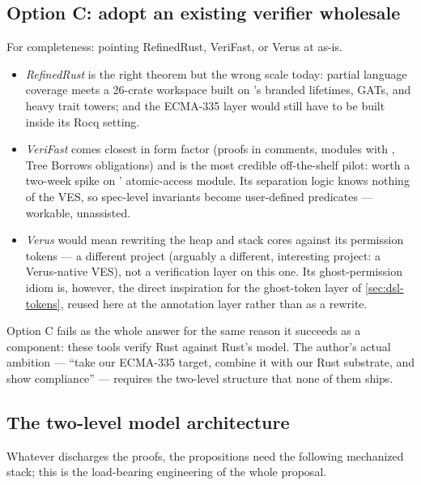 \subsection{Option C: adopt an existing verifier wholesale}
\label{sec:design-adopt}

For completeness: pointing RefinedRust, VeriFast, or Verus at
 as-is.

\begin{itemize}[leftmargin=1.4em]
\item \emph{RefinedRust} is the right theorem but the wrong scale today:
  partial language coverage meets a 26-crate workspace built on
  \gcarena{}'s branded lifetimes, GATs, and heavy trait towers; and the
  ECMA-335 layer would still have to be built inside its Rocq setting.
\item \emph{VeriFast} comes closest in form factor (proofs in comments,
  modules with , Tree Borrows obligations) and is the most
  credible off-the-shelf pilot: worth a two-week spike on
  ' atomic-access module. Its separation logic knows
  nothing of the VES, so spec-level invariants become user-defined
  predicates --- workable, unassisted.
\item \emph{Verus} would mean rewriting the heap and stack cores against
  its permission tokens --- a different project (arguably a different,
  interesting project: a Verus-native VES), not a verification layer on
  this one. Its ghost-permission idiom is, however, the direct
  inspiration for the ghost-token layer of \cref{sec:dsl-tokens},
  reused here at the annotation layer rather than as a rewrite.
\end{itemize}

Option C fails as the whole answer for the same reason it succeeds as a
component: these tools verify Rust against Rust's model. The author's
actual ambition --- ``take our ECMA-335 target, combine it with our Rust
substrate, and show compliance'' --- requires the two-level structure
that none of them ships.

\subsection{The two-level model architecture}
\label{sec:design-model}

Whatever discharges the proofs, the propositions need the following
mechanized stack; this is the load-bearing engineering of the whole
proposal.

